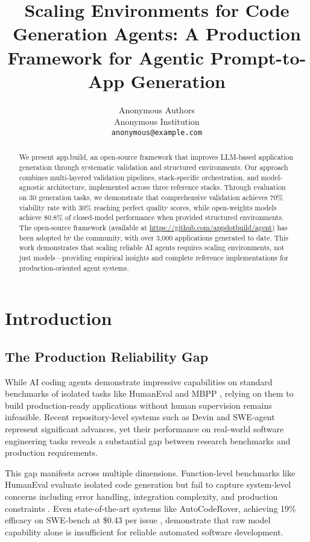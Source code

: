 \documentclass{article}
\title{Scaling Environments for Code Generation Agents: A Production Framework for Agentic Prompt-to-App Generation}
\author{%
  Anonymous Authors \\
  Anonymous Institution \\
  \texttt{anonymous@example.com} \\
}
\begin{document}
\maketitle

\begin{abstract}
We present app.build, an open-source framework that improves LLM-based application generation through systematic validation and structured environments. Our approach combines multi-layered validation pipelines, stack-specific orchestration, and model-agnostic architecture, implemented across three reference stacks. Through evaluation on 30 generation tasks, we demonstrate that comprehensive validation achieves 70\% viability rate with 30\% reaching perfect quality scores, while open-weights models achieve 80.8\% of closed-model performance when provided structured environments. The open-source framework (available at \url{https://github.com/appdotbuild/agent}) has been adopted by the community, with over 3,000 applications generated to date. This work demonstrates that scaling reliable AI agents requires scaling environments, not just models---providing empirical insights and complete reference implementations for production-oriented agent systems.
\end{abstract}

\section{Introduction}

\subsection{The Production Reliability Gap}

While AI coding agents demonstrate impressive capabilities on standard benchmarks of isolated tasks like HumanEval \citep{chen2021evaluating} and MBPP \citep{austin2021program}, relying on them to build production-ready applications without human supervision remains infeasible. Recent repository-level systems such as Devin \citep{cognition2024swe} and SWE-agent \citep{yang2024swe} represent significant advances, yet their performance on real-world software engineering tasks reveals a substantial gap between research benchmarks and production requirements.

This gap manifests across multiple dimensions. Function-level benchmarks like HumanEval evaluate isolated code generation but fail to capture system-level concerns including error handling, integration complexity, and production constraints \citep{liu2023your}. Even state-of-the-art systems like AutoCodeRover, achieving 19\% efficacy on SWE-bench at \$0.43 per issue \citep{zhang2024autocoder}, demonstrate that raw model capability alone is insufficient for reliable automated software development.
\end{document}
